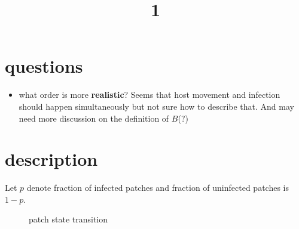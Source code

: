 \documentclass[12pt]{article}
\title{1}
\begin{document}
\section*{questions}
\begin{itemize}
    \item what order is more \textbf{realistic}? Seems that host movement and infection should happen simultaneously but not sure how to describe that. And may need more discussion on the definition of $B$(?)
\end{itemize}


\section{description}
Let $p$ denote fraction of infected patches and fraction of uninfected patches is $1-p$. 
\begin{figure}[H]
\centering
{}
\caption{patch state transition}
\end{figure}
\end{document}
